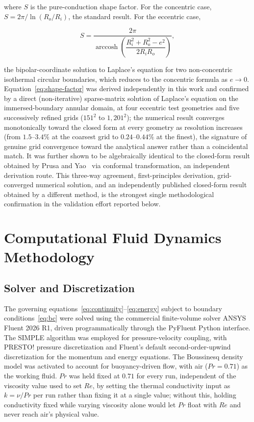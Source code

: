 where $S$ is the pure-conduction shape factor. For the concentric case, $S = 2\pi/\ln(R_o/R_i)$, the standard result. For the eccentric case,

\begin{equation}
  S = \frac{2\pi}{\operatorname{arccosh}\!\left(\dfrac{R_i^2+R_o^2-e^2}{2 R_i R_o}\right)},
  \label{eq:shape-factor}
\end{equation}

the bipolar-coordinate solution to Laplace's equation for two non-concentric isothermal circular boundaries, which reduces to the concentric formula as $e\to0$. Equation~\eqref{eq:shape-factor} was derived independently in this work and confirmed by a direct (non-iterative) sparse-matrix solution of Laplace's equation on the immersed-boundary annular domain, at four eccentric test geometries and five successively refined grids ($151^2$ to $1{,}201^2$); the numerical result converges monotonically toward the closed form at every geometry as resolution increases (from $1.5$--$3.4\%$ at the coarsest grid to $0.24$--$0.44\%$ at the finest), the signature of genuine grid convergence toward the analytical answer rather than a coincidental match. It was further shown to be algebraically identical to the closed-form result obtained by Prusa and Yao~\cite{PrusaYao1983} via conformal transformation, an independent derivation route. This three-way agreement, first-principles derivation, grid-converged numerical solution, and an independently published closed-form result obtained by a different method, is the strongest single methodological confirmation in the validation effort reported below.

\section{Computational Fluid Dynamics Methodology}
\label{sec:cfd}

\subsection{Solver and Discretization}
\label{subsec:solver}

The governing equations~\eqref{eq:continuity}--\eqref{eq:energy} subject to boundary conditions~\eqref{eq:bc} were solved using the commercial finite-volume solver ANSYS Fluent 2026 R1, driven programmatically through the PyFluent Python interface. The SIMPLE algorithm was employed for pressure-velocity coupling, with PRESTO! pressure discretization and Fluent's default second-order-upwind discretization for the momentum and energy equations. The Boussinesq density model was activated to account for buoyancy-driven flow, with air ($Pr=0.71$) as the working fluid. $Pr$ was held fixed at $0.71$ for every run, independent of the viscosity value used to set $Re$, by setting the thermal conductivity input as $k=\nu/Pr$ per run rather than fixing it at a single value; without this, holding conductivity fixed while varying viscosity alone would let $Pr$ float with $Re$ and never reach air's physical value.

